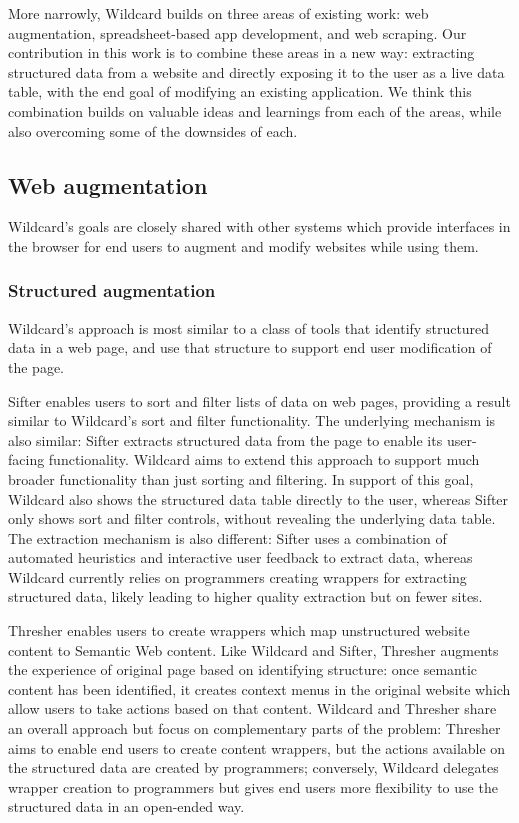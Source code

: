 \documentclass[english,submission]{programming}
\begin{document}
More narrowly, Wildcard builds on three areas of existing work: web
augmentation, spreadsheet-based app development, and web scraping. Our
contribution in this work is to combine these areas in a new way:
extracting structured data from a website and directly exposing it to
the user as a live data table, with the end goal of modifying an
existing application. We think this combination builds on valuable ideas
and learnings from each of the areas, while also overcoming some of the
downsides of each.

\hypertarget{web-augmentation}{%
\subsection{Web augmentation}\label{web-augmentation}}

Wildcard's goals are closely shared with other systems which provide
interfaces in the browser for end users to augment and modify websites
while using them.

\hypertarget{structured-augmentation}{%
\subsubsection{Structured augmentation}\label{structured-augmentation}}

Wildcard's approach is most similar to a class of tools that identify
structured data in a web page, and use that structure to support end
user modification of the page.

Sifter \autocite{huynh2006} enables users to sort and filter lists of
data on web pages, providing a result similar to Wildcard's sort and
filter functionality. The underlying mechanism is also similar: Sifter
extracts structured data from the page to enable its user-facing
functionality. Wildcard aims to extend this approach to support much
broader functionality than just sorting and filtering. In support of
this goal, Wildcard also shows the structured data table directly to the
user, whereas Sifter only shows sort and filter controls, without
revealing the underlying data table. The extraction mechanism is also
different: Sifter uses a combination of automated heuristics and
interactive user feedback to extract data, whereas Wildcard currently
relies on programmers creating wrappers for extracting structured data,
likely leading to higher quality extraction but on fewer sites.

Thresher \autocite{hogue2005} enables users to create wrappers which map
unstructured website content to Semantic Web content. Like Wildcard and
Sifter, Thresher augments the experience of original page based on
identifying structure: once semantic content has been identified, it
creates context menus in the original website which allow users to take
actions based on that content. Wildcard and Thresher share an overall
approach but focus on complementary parts of the problem: Thresher aims
to enable end users to create content wrappers, but the actions
available on the structured data are created by programmers; conversely,
Wildcard delegates wrapper creation to programmers but gives end users
more flexibility to use the structured data in an open-ended way.
\end{document}
